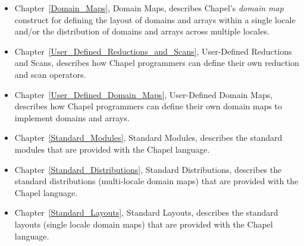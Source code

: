 \begin{itemize}
\item
Chapter~\ref{Domain_Maps}, Domain Maps, describes
Chapel's \emph{domain map} construct for defining the layout of
domains and arrays within a single locale and/or the distribution of
domains and arrays across multiple locales.

\item
Chapter~\ref{User_Defined_Reductions_and_Scans}, User-Defined
Reductions and Scans, describes how Chapel programmers can define
their own reduction and scan operators.

\item
Chapter~\ref{User_Defined_Domain_Maps}, User-Defined Domain Maps,
describes how Chapel programmers can define their own domain maps to
implement domains and arrays.

\item
Chapter~\ref{Standard_Modules}, Standard Modules, describes the
standard modules that are provided with the Chapel language.

\item
Chapter~\ref{Standard_Distributions}, Standard Distributions,
describes the standard distributions (multi-locale domain maps) that
are provided with the Chapel language.

\item
Chapter~\ref{Standard_Layouts}, Standard Layouts, describes the
standard layouts (single locale domain maps) that are provided with
the Chapel language.

\end{itemize}
